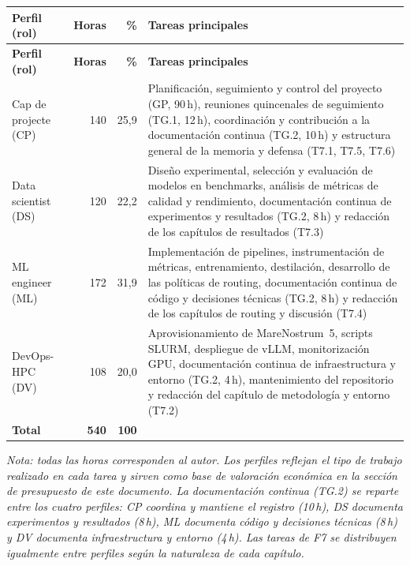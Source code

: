 {\footnotesize
\begin{tabularx}{\textwidth}{l r r >{\raggedright\arraybackslash}X}
\caption{Distribución de horas por perfil profesional. Elaboración propia.}\label{tab:roles}\\
\toprule
\textbf{Perfil (rol)} & \textbf{Horas} & \textbf{\%} & \textbf{Tareas principales} \\
\midrule
\endfirsthead
\toprule
\textbf{Perfil (rol)} & \textbf{Horas} & \textbf{\%} & \textbf{Tareas principales} \\
\midrule
\endhead
\bottomrule
\endlastfoot
Cap de projecte (CP) & 140 & 25,9 & Planificación, seguimiento y control del proyecto (GP, 90\,h), reuniones quincenales de seguimiento (TG.1, 12\,h), coordinación y contribución a la documentación continua (TG.2, 10\,h) y estructura general de la memoria y defensa (T7.1, T7.5, T7.6) \\
Data scientist (DS) & 120 & 22,2 & Diseño experimental, selección y evaluación de modelos en benchmarks, análisis de métricas de calidad y rendimiento, documentación continua de experimentos y resultados (TG.2, 8\,h) y redacción de los capítulos de resultados (T7.3) \\
ML engineer (ML) & 172 & 31,9 & Implementación de pipelines, instrumentación de métricas, entrenamiento, destilación, desarrollo de las políticas de routing, documentación continua de código y decisiones técnicas (TG.2, 8\,h) y redacción de los capítulos de routing y discusión (T7.4) \\
DevOps-HPC (DV) & 108 & 20,0 & Aprovisionamiento de MareNostrum~5, scripts SLURM, despliegue de vLLM, monitorización GPU, documentación continua de infraestructura y entorno (TG.2, 4\,h), mantenimiento del repositorio y redacción del capítulo de metodología y entorno (T7.2) \\
\midrule
\textbf{Total} & \textbf{540} & \textbf{100} & \\
\end{tabularx}
}

\noindent\textit{\footnotesize Nota: todas las horas corresponden al autor. Los perfiles reflejan el tipo de trabajo realizado en cada tarea y sirven como base de valoración económica en la sección de presupuesto de este documento. La documentación continua (TG.2) se reparte entre los cuatro perfiles: CP coordina y mantiene el registro (10\,h), DS documenta experimentos y resultados (8\,h), ML documenta código y decisiones técnicas (8\,h) y DV documenta infraestructura y entorno (4\,h). Las tareas de F7 se distribuyen igualmente entre perfiles según la naturaleza de cada capítulo.}

